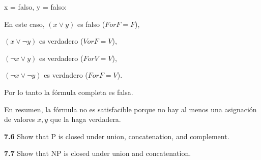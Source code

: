 \documentclass{article}
\begin{document}
    x = falso, y = falso:

    En este caso, 
    $ (x \lor y)$ es falso ($F or F = F$),

    $(x \lor \neg{y})$ es verdadero ($V or F = V$),

    $(\neg{x} \lor y)$ es verdadero ($F or V = V$),

    $(\neg{x} \lor \neg{y})$ es verdadero ($F or F = V$).

    Por lo tanto la fórmula completa es falsa.
    

En resumen, la fórmula no es satisfacible porque no hay al menos una asignación
de valores $x,y$ que la haga verdadera.

\textbf{7.6} Show that P is closed under union, concatenation, and complement.



\textbf{7.7} Show that NP is closed under union and concatenation.
\end{document}
